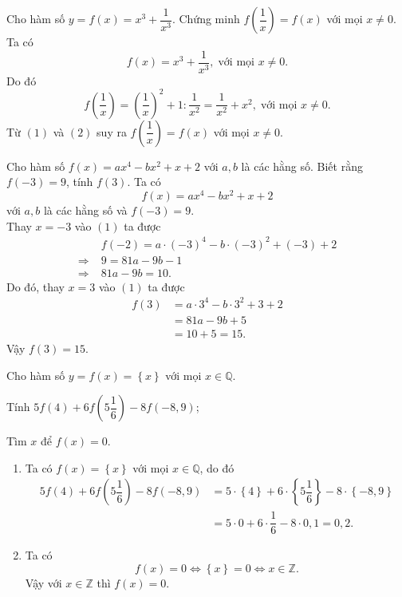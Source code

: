 \begin{vn}
Cho hàm số $y=f(x)=x^3+\dfrac{1}{x^3}$. Chứng minh $f\left(\dfrac{1}{x}\right)=f(x)$ với mọi $x\ne 0.$
\loigiai
{
Ta có \[f(x)=x^3+\dfrac{1}{x^3},\;\text{với mọi $x\ne 0$}.\tag{1}\]
Do đó
\[f\left(\dfrac{1}{x}\right)=\left(\dfrac{1}{x}\right)^2+1:\dfrac{1}{x^2}=\dfrac{1}{x^2}+x^2,\;\text{với mọi $x\ne 0$}.\tag{2}\]
Từ $(1)$ và $(2)$ suy ra $f\left(\dfrac{1}{x}\right)=f(x)$ với mọi $x\ne 0.$
}
\end{vn}

\begin{vn}
Cho hàm số $f(x)=ax^4-bx^2+x+2$ với $a,b$ là các hằng số. Biết rằng $f(-3)=9$, tính $f(3)$.
\loigiai
{
Ta có \[f(x)=ax^4-bx^2+x+2\tag{1}\] với $a,b$ là các hằng số và $f(-3)=9$.\\
Thay $x=-3$ vào $(1)$ ta được
\begin{align*}
&f(-2)=a\cdot (-3)^4-b\cdot (-3)^2+(-3)+2\\ 
\Rightarrow\;&9=81a-9b-1\\
\Rightarrow\;&81a-9b=10.
\end{align*}
Do đó, thay $x=3$ vào $(1)$ ta được
\begin{align*}
f(3)&=a\cdot 3^4-b\cdot 3^2+3+2\\ 
&=81a-9b+5\\
&=10+5=15.
\end{align*}
Vậy $f(3)=15$.
}
\end{vn}

\begin{vn}
Cho hàm số $y=f(x)=\left\{x\right\}$ với mọi $x\in\mathbb{Q}$.
\begin{listEX}[2]
\item Tính $5f(4)+6f\left(5\dfrac{1}{6}\right)-8f(-8,9)$;
\item Tìm $x$ để $f(x)=0$.
\end{listEX}
\loigiai
{
\begin{enumerate}
\item Ta có $f(x)=\left\{x\right\}$ với mọi $x\in\mathbb{Q}$, do đó
\begin{align*}
5f(4)+6f\left(5\dfrac{1}{6}\right)-8f(-8,9)&=5\cdot \left\{4\right\}+6\cdot\left\{5\dfrac{1}{6}\right\}-8\cdot \left\{-8,9\right\}\\ 
&=5\cdot 0+6\cdot \dfrac{1}{6}-8\cdot 0,1=0,2.
\end{align*}
\item Ta có
\[f(x)=0 \Leftrightarrow \left\{x\right\}=0\Leftrightarrow x\in\mathbb{Z}.\]
Vậy với $x\in\mathbb{Z}$ thì $f(x)=0$.
\end{enumerate}
}
\end{vn}

